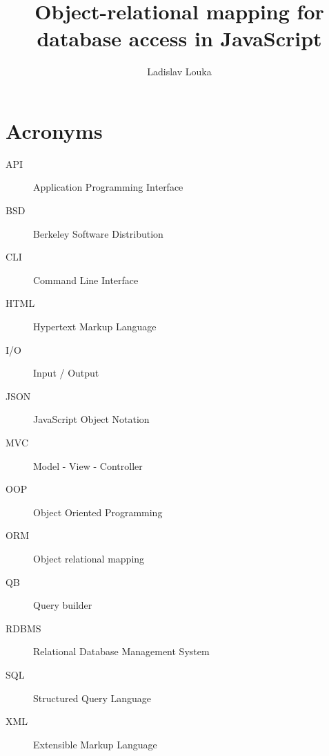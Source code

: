 \documentclass[thesis=M,english]{FITthesis}[2019/12/23]
\title{Object-relational mapping for database access in JavaScript}
\author{Ladislav Louka} %
\begin{document}


\chapter{Acronyms}
\begin{description}
	\item[API] Application Programming Interface
	\item[BSD] Berkeley Software Distribution
	\item[CLI] Command Line Interface
	\item[HTML] Hypertext Markup Language
	\item[I/O] Input / Output
	\item[JSON] JavaScript Object Notation 
	\item[MVC] Model - View - Controller
	\item[OOP] Object Oriented Programming 
	\item[ORM] Object relational mapping
	\item[QB] Query builder
	\item[RDBMS] Relational Database Management System
	\item[SQL] Structured Query Language	
	\item[XML] Extensible Markup Language
\end{description}















% 
% 

\appendix

{
	\setlength{\emergencystretch}{1em}
	\printbibliography
}
\end{document}
